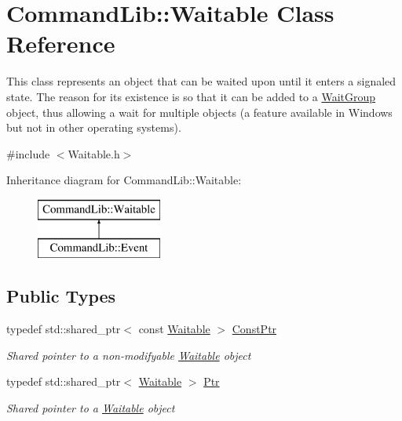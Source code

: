 \hypertarget{class_command_lib_1_1_waitable}{}\section{Command\+Lib\+:\+:Waitable Class Reference}
\label{class_command_lib_1_1_waitable}


This class represents an object that can be waited upon until it enters a signaled state. The reason for its existence is so that it can be added to a \mbox{\hyperlink{class_command_lib_1_1_wait_group}{Wait\+Group}} object, thus allowing a wait for multiple objects (a feature available in Windows but not in other operating systems).  




{\ttfamily \#include $<$Waitable.\+h$>$}

Inheritance diagram for Command\+Lib\+:\+:Waitable\+:\begin{figure}[H]
\begin{center}
\leavevmode
\includegraphics[height=2.000000cm]{class_command_lib_1_1_waitable}
\end{center}
\end{figure}
\subsection*{Public Types}
\begin{DoxyCompactItemize}
\item 
typedef std\+::shared\+\_\+ptr$<$ const \mbox{\hyperlink{class_command_lib_1_1_waitable}{Waitable}} $>$ \mbox{\hyperlink{class_command_lib_1_1_waitable_a2b2652c778560613f9e7dd93be596387}{Const\+Ptr}}
\begin{DoxyCompactList}\small\item\em Shared pointer to a non-\/modifyable \mbox{\hyperlink{class_command_lib_1_1_waitable}{Waitable}} object\end{DoxyCompactList}\item 
typedef std\+::shared\+\_\+ptr$<$ \mbox{\hyperlink{class_command_lib_1_1_waitable}{Waitable}} $>$ \mbox{\hyperlink{class_command_lib_1_1_waitable_ac74b6b91e48220146eada76a31cf2d9b}{Ptr}}
\begin{DoxyCompactList}\small\item\em Shared pointer to a \mbox{\hyperlink{class_command_lib_1_1_waitable}{Waitable}} object\end{DoxyCompactList}\end{DoxyCompactItemize}

